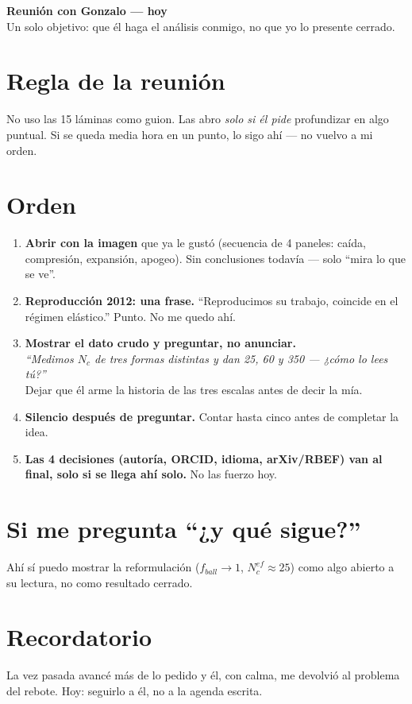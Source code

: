 \documentclass[11pt,a4paper]{article}
\begin{document}
{\Large\bfseries Reunión con Gonzalo — hoy}\\[2pt]
{\small Un solo objetivo: que él haga el análisis conmigo, no que yo lo presente cerrado.}

\section*{Regla de la reunión}
No uso las 15 láminas como guion. Las abro \emph{solo si él pide} profundizar
en algo puntual. Si se queda media hora en un punto, lo sigo ahí —
no vuelvo a mi orden.

\section*{Orden}

\begin{enumerate}[leftmargin=1.4em,itemsep=4pt]
  \item \textbf{Abrir con la imagen} que ya le gustó (secuencia de 4 paneles:
  caída, compresión, expansión, apogeo). Sin conclusiones todavía —
  solo ``mira lo que se ve''.

  \item \textbf{Reproducción 2012: una frase.} ``Reproducimos su trabajo,
  coincide en el régimen elástico.'' Punto. No me quedo ahí.

  \item \textbf{Mostrar el dato crudo y preguntar, no anunciar.}\\
  \emph{``Medimos $N_c$ de tres formas distintas y dan 25, 60 y 350 —
  ¿cómo lo lees tú?''}\\
  Dejar que él arme la historia de las tres escalas antes de decir
  la mía.

  \item \textbf{Silencio después de preguntar.} Contar hasta cinco antes
  de completar la idea.

  \item \textbf{Las 4 decisiones (autoría, ORCID, idioma, arXiv/RBEF)
  van al final, solo si se llega ahí solo.} No las fuerzo hoy.
\end{enumerate}

\section*{Si me pregunta ``¿y qué sigue?''}
Ahí sí puedo mostrar la reformulación ($f_{ball}\to 1$, $N_c^{ef}\approx25$)
como algo abierto a su lectura, no como resultado cerrado.

\section*{Recordatorio}
La vez pasada avancé más de lo pedido y él, con calma, me devolvió al
problema del rebote. Hoy: seguirlo a él, no a la agenda escrita.
\end{document}
